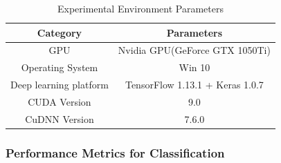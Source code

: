 \documentclass[conference]{IEEEtran}
\begin{document}

\linespread{1.5}
\begin{table}[htbp]
	\caption{Experimental Environment Parameters}
	\begin{center}
		\begin{tabular}{c c}
			\hline
			\textbf{Category}&{\textbf{Parameters}} \\
			\hline
			GPU & Nvidia GPU(GeForce GTX 1050Ti)  \\
			Operating System & Win 10 \\
			Deep learning platform & TensorFlow 1.13.1 + Keras 1.0.7\\
			CUDA Version & 9.0\\
			CuDNN Version & 7.6.0\\
			\hline
		\end{tabular}
		\label{tab:parameters}
	\end{center}
\end{table}

\subsubsection{Performance Metrics for Classification}
\end{document}

